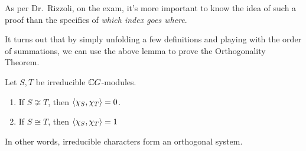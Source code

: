 \begin{remark}
    As per Dr.\ Rizzoli, on the exam, it's more important to know the idea of such a proof than the specifics of \textit{which index goes where}.
\end{remark}

It turns out that by simply unfolding a few definitions and playing with the order of summations, we can use the above lemma to prove the Orthogonality Theorem.

\begin{boxtheorem} \label{Ch2:Thm:Orth_Char}
    Let $S, T$ be irreducible $\mathbb{C} G$-modules.
    \begin{enumerate}[label = \normalfont \arabic*., noitemsep]
        \item If $S \not\cong T$, then $\left\langle \chi_S, \chi_T \right\rangle = 0$.
        \item If $S \cong T$, then $\left\langle \chi_S, \chi_T \right\rangle = 1$
    \end{enumerate}
    In other words, irreducible characters form an orthogonal system.
\end{boxtheorem}
